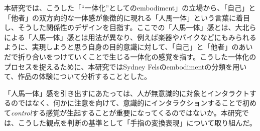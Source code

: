 

本研究では、こうした「``一体化''としてのembodiment」の立場から、「自己」と「他者」の双方向的な一体感が象徴的に現れる「人馬一体」という言葉に着目し、そうした関係性のデザインを目指す。ここでの「人馬一体」感とは、大北らによる「人馬一体」感とは用法が異なり、例えば楽器やバイクなどにもみられるように、実現しようと思う自身の目的意識に対して、「自己」と「他者」のあいだで折り合いをつけていくことで生じる一体化の感覚を指す。こうした一体化のプロセスを捉えるために、本研究ではSydney Felsのembodimentの分類を用いて、作品の体験について分析することとした。

「人馬一体」感を引き出すにあたっては、人が無意識的に対象とインタラクトするのではなく、何かに注意を向けて、意識的にインタラクションすることで初めて\textit{control}する感覚が生起することが重要になってくるのではないか。本研究では、こうした観点を判断の基準として「手指の変換表現」について取り組んだ。



